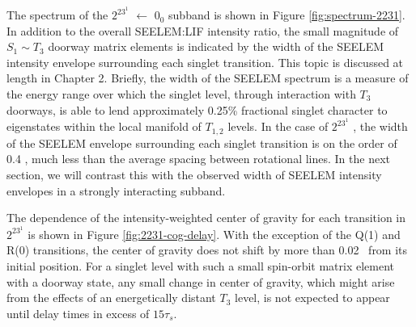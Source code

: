 \documentclass[12pt]{mitthesis}
\begin{document}
The spectrum of the $2^23^1$  $\leftarrow$ $0_0$ subband is
shown in Figure \ref{fig:spectrum-2231}.  In addition to the overall
SEELEM:LIF intensity ratio, the small magnitude of $S_1 \sim T_3$
doorway matrix elements is indicated by the width of the SEELEM
intensity envelope surrounding each singlet transition.  This topic is
discussed at length in Chapter 2.  Briefly, the width of the SEELEM
spectrum is a measure of the energy range over which the singlet
level, through interaction with $T_3$ doorways, is able to lend
approximately 0.25\% fractional singlet character to eigenstates
within the local manifold of $T_{1,2}$ levels.  In the case of
$2^23^1$ , the width of the SEELEM envelope surrounding each
singlet transition is on the order of 0.4 \rcm, much less than the
average spacing between rotational lines.  In the next section, we
will contrast this with the observed width of SEELEM intensity
envelopes in a strongly interacting subband.


The dependence of the intensity-weighted center of gravity for each
transition in $2^23^1$  is shown in Figure
\ref{fig:2231-cog-delay}.  With the exception of the Q(1) and R(0)
transitions, the center of gravity does not shift by more than 0.02
\rcm\ from its initial position.  For a singlet level with such a
small spin-orbit matrix element with a doorway state, any small change
in center of gravity, which might arise from the effects of an
energetically distant $T_3$ level, is not expected to appear until
delay times in excess of $15\tau_s$.
\end{document}
